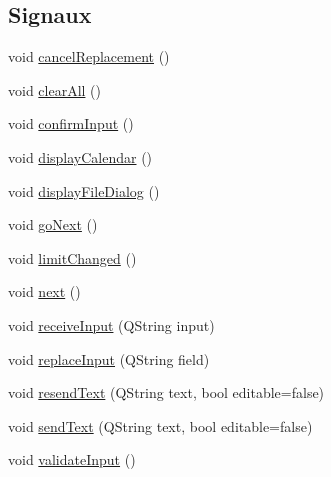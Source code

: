 \subsection*{Signaux}
\begin{DoxyCompactItemize}
\item 
void \hyperlink{classSH__InOutStateMachine_a035d37535533d4805fe2606f38c19380}{cancel\-Replacement} ()
\item 
void \hyperlink{classSH__InOutStateMachine_aa1d5860888c96ff94c55dc77e0fdfdcf}{clear\-All} ()
\item 
void \hyperlink{classSH__InOutStateMachine_a7f7d9c9300c1d05bce2c26029f28cc31}{confirm\-Input} ()
\item 
void \hyperlink{classSH__InOutStateMachine_ab3a12d1f9b658d8ffdc17669a6c065f2}{display\-Calendar} ()
\item 
void \hyperlink{classSH__InOutStateMachine_abd206c3bc32bb7690df9c3e1cd546ebc}{display\-File\-Dialog} ()
\item 
void \hyperlink{classSH__GenericStateMachine_aec37e33524182ab83bf300f1cc1a064e}{go\-Next} ()
\item 
void \hyperlink{classSH__LoopingInOutStateMachine_ab9ce2fc14467ccbfaf9ccb696d90d9df}{limit\-Changed} ()
\item 
void \hyperlink{classSH__GenericStateMachine_af4771d31d87951c997fba1633c2d67f6}{next} ()
\item 
void \hyperlink{classSH__InOutStateMachine_a037ed5e13ecfae2123a8d4940292e410}{receive\-Input} (Q\-String input)
\item 
void \hyperlink{classSH__InOutStateMachine_a9fa5db44086de2576c812f631aa4f60a}{replace\-Input} (Q\-String field)
\item 
void \hyperlink{classSH__InOutStateMachine_a526822c66b46aa0cd81ba4473fa5573f}{resend\-Text} (Q\-String text, bool editable=false)
\item 
void \hyperlink{classSH__InOutStateMachine_a5e7f5958bae31696b6a8deab94ad2b4f}{send\-Text} (Q\-String text, bool editable=false)
\item 
void \hyperlink{classSH__InOutStateMachine_aec1b3fef3c1f82499aa1f73beaecd08a}{validate\-Input} ()
\end{DoxyCompactItemize}
